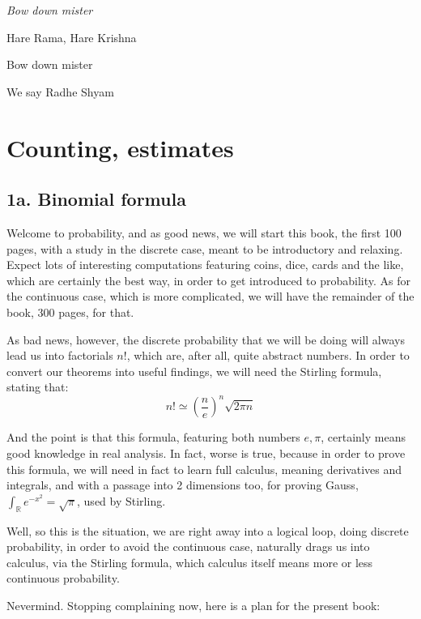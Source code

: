 \documentclass[12pt]{amsbook}
\begin{document}
\begin{center}
{\em Bow down mister

Hare Rama, Hare Krishna

Bow down mister

We say Radhe Shyam}
\end{center}

\chapter{Counting, estimates}

\section*{1a. Binomial formula}

Welcome to probability, and as good news, we will start this book, the first 100 pages, with a study in the discrete case, meant to be introductory and relaxing. Expect lots of interesting computations featuring coins, dice, cards and the like, which are certainly the best way, in order to get introduced to probability. As for the continuous case, which is more complicated, we will have the remainder of the book, 300 pages, for that.

\bigskip

As bad news, however, the discrete probability that we will be doing will always lead us into factorials $n!$, which are, after all, quite abstract numbers. In order to convert our theorems into useful findings, we will need the Stirling formula, stating that:
$$n!\simeq\left(\frac{n}{e}\right)^n\sqrt{2\pi n}$$

And the point is that this formula, featuring both numbers $e,\pi$, certainly means good knowledge in real analysis. In fact, worse is true, because in order to prove this formula, we will need in fact to learn full calculus, meaning derivatives and integrals, and with a passage into 2 dimensions too, for proving Gauss, $\int_\mathbb Re^{-x^2}=\sqrt{\pi}$, used by Stirling.

\bigskip

Well, so this is the situation, we are right away into a logical loop, doing discrete probability, in order to avoid the continuous case, naturally drags us into calculus, via the Stirling formula, which calculus itself means more or less continuous probability.

\bigskip

Nevermind. Stopping complaining now, here is a plan for the present book:
\end{document}

